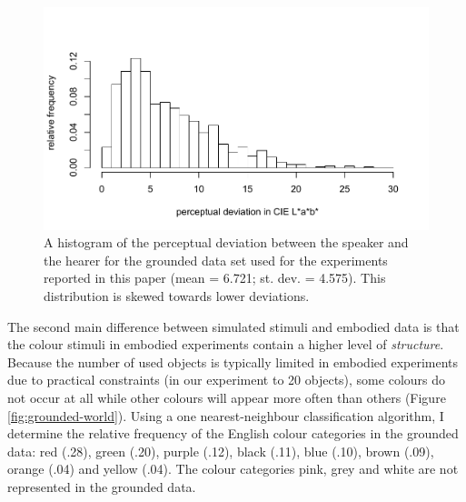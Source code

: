 \begin{figure}[htbp]
\begin{center}
\includegraphics[width=.8\textwidth]{./experiments/figures/grounding-perceptual-deviation.pdf}
\caption[Perceptual deviation between the speaker and the hearer]{A
  histogram of the perceptual deviation between the speaker and the
  hearer for the grounded data set used for the experiments reported
  in this paper (mean = 6.721; st. dev. = 4.575). This distribution is
  skewed towards lower deviations.}
\label{f:perceptual-deviation}
\end{center}
\end{figure}

The second main difference between simulated stimuli and embodied data
is that the colour stimuli in embodied experiments contain a higher
level of \emph{structure}. Because the number of used objects is
typically limited in embodied experiments due to practical constraints
(in our experiment to 20 objects), some colours do not occur at all
while other colours will appear more often than others (Figure
\ref{fig:grounded-world}). Using a one nearest-neighbour
classification algorithm, I determine the relative frequency of the
English colour categories \citep{sturges95location} in the grounded
data: red (.28), green (.20), purple (.12), black (.11), blue (.10),
brown (.09), orange (.04) and yellow (.04). The colour categories
pink, grey and white are not represented in the grounded data.

